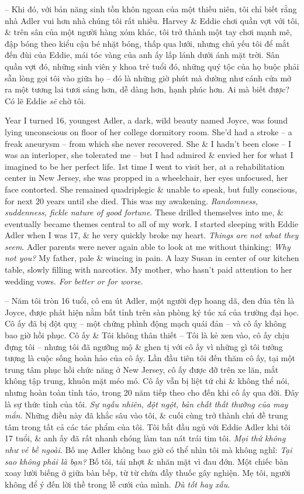 \documentclass{article}
\begin{document}
\begin{itemize}
	-- Khi đó, với bản năng sinh tồn khôn ngoan của một thiếu niên, tôi chỉ biết rằng nhà Adler vui hơn nhà chúng tôi rất nhiều. {\sc Harvey \& Eddie} chơi quần vợt với tôi, \& trên sân của một người hàng xóm khác, tôi trở thành một tay chơi mạnh mẽ, đập bóng theo kiểu cậu bé nhặt bóng, thấp qua lưới, nhưng chủ yếu tôi để mắt đến đùi của {\sc Eddie}, mái tóc vàng của anh ấy lấp lánh dưới ánh mặt trời. Sân quần vợt đó, những sinh viên y khoa trẻ tuổi đó, những quý tộc của họ buộc phải sẵn lòng gọi tôi vào giữa họ -- đó là những giờ phút mà dường như cánh cửa mở ra một tương lai tươi sáng hơn, dễ dàng hơn, hạnh phúc hơn. Ai mà biết được? Có lẽ {\sc Eddie} {\it sẽ} chờ tôi.
	
	Year I turned 16, youngest Adler, a dark, wild beauty named {\sc Joyce}, was found lying unconscious on floor of her college dormitory room. She'd had a stroke -- a freak aneurysm -- from which she never recovered. She \& I hadn't been close -- I was an interloper, she tolerated me -- but I had admired \& envied her for what I imagined to be her perfect life. 1st time I went to visit her, at a rehabilitation center in New Jersey, she was propped in a wheelchair, her eyes unfocused, her face contorted. She remained quadriplegic \& unable to speak, but fully conscious, for next 20 years until she died. This was my awakening. {\it Randomness, suddenness, fickle nature of good fortune}. These drilled themselves into me, \& eventually became themes central to all of my work. I started sleeping with {\sc Eddie Adler} when I was 17, \& he very quickly broke my heart. {\it Things are not what they seem}. Adler parents were never again able to look at me without thinking: {\it Why not you?} My father, pale \& wincing in pain. A lazy Susan in center of our kitchen table,  slowly filling with narcotics. My mother, who hasn't paid attention to her wedding vows. {\it For better or for worse}.
	
	-- Năm tôi tròn 16 tuổi, cô em út Adler, một người đẹp hoang dã, đen đúa tên là {\sc Joyce}, được phát hiện nằm bất tỉnh trên sàn phòng ký túc xá của trường đại học. Cô ấy đã bị đột quỵ -- một chứng phình động mạch quái đản -- và cô ấy không bao giờ hồi phục. Cô ấy \& Tôi không thân thiết -- Tôi là kẻ xen vào, cô ấy chịu đựng tôi -- nhưng tôi đã ngưỡng mộ \& ghen tị với cô ấy vì những gì tôi tưởng tượng là cuộc sống hoàn hảo của cô ấy. Lần đầu tiên tôi đến thăm cô ấy, tại một trung tâm phục hồi chức năng ở New Jersey, cô ấy được đỡ trên xe lăn, mắt không tập trung, khuôn mặt méo mó. Cô ấy vẫn bị liệt tứ chi \& không thể nói, nhưng hoàn toàn tỉnh táo, trong 20 năm tiếp theo cho đến khi cô ấy qua đời. Đây là sự thức tỉnh của tôi. {\it Sự ngẫu nhiên, đột ngột, bản chất thất thường của may mắn}. Những điều này đã khắc sâu vào tôi, \& cuối cùng trở thành chủ đề trung tâm trong tất cả các tác phẩm của tôi. Tôi bắt đầu ngủ với {\sc Eddie Adler} khi tôi 17 tuổi, \& anh ấy đã rất nhanh chóng làm tan nát trái tim tôi. {\it Mọi thứ không như vẻ bề ngoài}. Bố mẹ Adler không bao giờ có thể nhìn tôi mà không nghĩ: {\it Tại sao không phải là bạn?} Bố tôi, tái nhợt \& nhăn mặt vì đau đớn. Một chiếc bàn xoay lười biếng ở giữa bàn bếp, từ từ chứa đầy thuốc gây nghiện. Mẹ tôi, người không để ý đến lời thề trong lễ cưới của mình. {\it Dù tốt hay xấu}.
	

\end{itemize}
\end{document}
